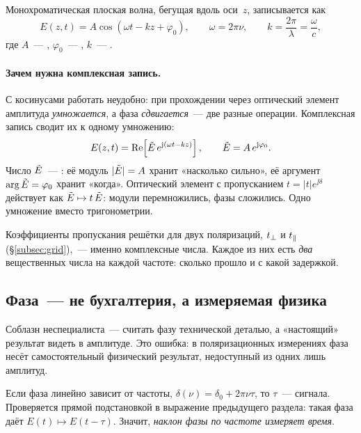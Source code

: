 \noindent
Монохроматическая плоская волна, бегущая вдоль оси~$z$, записывается как
\[
  E(z,t)=A\cos(\omega t-kz+\varphi_0),
  \qquad \omega=2\pi\nu,\qquad k=\frac{2\pi}{\lambda}=\frac{\omega}{c},
\]
где $A$~--- , $\varphi_0$~--- , $k$~--- .

\paragraph{Зачем нужна комплексная запись.} С косинусами работать неудобно: при прохождении
через оптический элемент амплитуда \emph{умножается}, а фаза \emph{сдвигается}~--- две разные
операции. Комплексная запись сводит их к одному умножению:
\[
  E(z,t)=\operatorname{Re}\!\left[\tilde{E}\,e^{\mathrm{j}(\omega t-kz)}\right],
  \qquad \tilde{E}=A\,e^{\mathrm{j}\varphi_0}.
\]
Число $\tilde{E}$~--- : её модуль $|\tilde{E}|=A$ хранит «насколько
сильно», её аргумент $\arg\tilde{E}=\varphi_0$ хранит «когда». Оптический элемент с пропусканием
$t=|t|e^{\jj\delta}$ действует как $\tilde{E}\mapsto t\,\tilde{E}$: модули перемножились, фазы
сложились. Одно умножение вместо тригонометрии.

\begin{strict}
Коэффициенты пропускания решётки для двух поляризаций, $t_{\perp}$ и $t_{\parallel}$
(§\ref{subsec:grid}),~--- именно комплексные числа. Каждое из них есть \emph{два} вещественных
числа на каждой частоте: сколько прошло и с какой задержкой.
\end{strict}

\subsection{Фаза~--- не бухгалтерия, а измеряемая физика}
\label{subsec:phase}

Соблазн неспециалиста~--- считать фазу технической деталью, а «настоящий» результат видеть в
амплитуде. Это ошибка: в поляризационных измерениях фаза несёт самостоятельный физический
результат, недоступный из одних лишь амплитуд.

\begin{strict}
Если фаза линейно зависит от частоты, $\delta(\nu)=\delta_0+2\pi\nu\tau$, то $\tau$~---
 сигнала. Проверяется прямой подстановкой в выражение предыдущего
раздела: такая фаза даёт $E(t)\mapsto E(t-\tau)$. Значит, \emph{наклон фазы по частоте измеряет
время}.
\end{strict}

